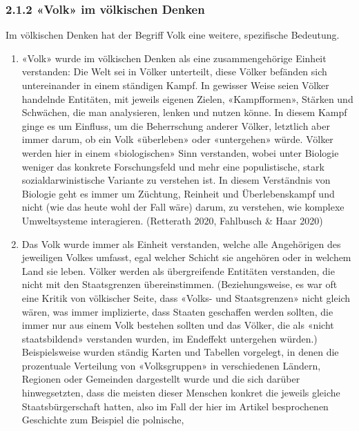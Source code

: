 \documentclass[a4paper,
fontsize=11pt,
oneside,
numbers=noperiodatend,
parskip=half-,
bibliography=totoc,
final
]{scrartcl}
\begin{document}
\hypertarget{volk-im-vuxf6lkischen-denken}{%
\subsubsection{2.1.2 «Volk» im völkischen
Denken}\label{volk-im-vuxf6lkischen-denken}}

Im völkischen Denken hat der Begriff Volk eine weitere, spezifische
Bedeutung.

\begin{enumerate}
\def\labelenumi{\arabic{enumi}.}
\item
  «Volk» wurde im völkischen Denken als eine zusammengehörige Einheit
  verstanden: Die Welt sei in Völker unterteilt, diese Völker befänden
  sich untereinander in einem ständigen Kampf. In gewisser Weise seien
  Völker handelnde Entitäten, mit jeweils eigenen Zielen, «Kampfformen»,
  Stärken und Schwächen, die man analysieren, lenken und nutzen könne.
  In diesem Kampf ginge es um Einfluss, um die Beherrschung anderer
  Völker, letztlich aber immer darum, ob ein Volk «überleben» oder
  «untergehen» würde. Völker werden hier in einem «biologischen» Sinn
  verstanden, wobei unter Biologie weniger das konkrete Forschungsfeld
  und mehr eine populistische, stark sozialdarwinistische Variante zu
  verstehen ist. In diesem Verständnis von Biologie geht es immer um
  Züchtung, Reinheit und Überlebenskampf und nicht (wie das heute wohl
  der Fall wäre) darum, zu verstehen, wie komplexe Umweltsysteme
  interagieren. (Retterath 2020, Fahlbusch \& Haar 2020)
\item
  Das Volk wurde immer als Einheit verstanden, welche alle Angehörigen
  des jeweiligen Volkes umfasst, egal welcher Schicht sie angehören oder
  in welchem Land sie leben. Völker werden als übergreifende Entitäten
  verstanden, die nicht mit den Staatsgrenzen übereinstimmen.
  (Beziehungsweise, es war oft eine Kritik von völkischer Seite, dass
  «Volks- und Staatsgrenzen» nicht gleich wären, was immer implizierte,
  dass Staaten geschaffen werden sollten, die immer nur aus einem Volk
  bestehen sollten und das Völker, die als «nicht staatsbildend»
  verstanden wurden, im Endeffekt untergehen würden.) Beispielsweise
  wurden ständig Karten und Tabellen vorgelegt, in denen die prozentuale
  Verteilung von «Volksgruppen» in verschiedenen Ländern, Regionen oder
  Gemeinden dargestellt wurde und die sich darüber hinwegsetzten, dass
  die meisten dieser Menschen konkret die jeweils gleiche
  Staatsbürgerschaft hatten, also im Fall der hier im Artikel
  besprochenen Geschichte zum Beispiel die polnische,

\end{enumerate}
\end{document}
